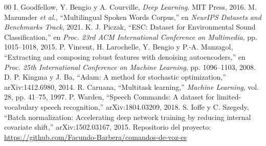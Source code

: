 \documentclass[conference]{IEEEtran}
\begin{document}
\begin{thebibliography}{00}
 I. Goodfellow, Y. Bengio y A. Courville, \textit{Deep Learning}. MIT Press, 2016.
 M. Mazumder \textit{et al.}, ``Multilingual Spoken Words Corpus,'' en \textit{NeurIPS Datasets and Benchmarks Track}, 2021.
 K. J. Piczak, ``ESC: Dataset for Environmental Sound Classification,'' en \textit{Proc. 23rd ACM International Conference on Multimedia}, pp. 1015--1018, 2015.
 P. Vincent, H. Larochelle, Y. Bengio y P.-A. Manzagol, ``Extracting and composing robust features with denoising autoencoders,'' en \textit{Proc. 25th International Conference on Machine Learning}, pp. 1096--1103, 2008.
 D. P. Kingma y J. Ba, ``Adam: A method for stochastic optimization,'' arXiv:1412.6980, 2014.
 R. Caruana, ``Multitask learning,'' \textit{Machine Learning}, vol. 28, pp. 41--75, 1997.
 P. Warden, ``Speech Commands: A dataset for limited-vocabulary speech recognition,'' arXiv:1804.03209, 2018.
 S. Ioffe y C. Szegedy, ``Batch normalization: Accelerating deep network training by reducing internal covariate shift,'' arXiv:1502.03167, 2015.
 Repositorio del proyecto: \url{https://github.com/Facundo-Barbera/comandos-de-voz-es}
\end{thebibliography}
\end{document}
